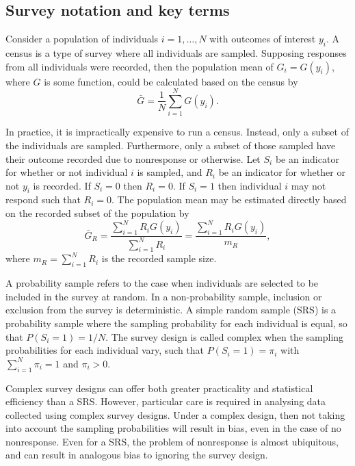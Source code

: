 \documentclass[a4paper, nobind]{templates/ociamthesis}
\begin{document}
\hypertarget{survey-notation-and-key-terms}{%
\subsection{Survey notation and key terms}\label{survey-notation-and-key-terms}}

Consider a population of individuals \(i = 1, \ldots, N\) with outcomes of interest \(y_i\).
A census is a type of survey where all individuals are sampled.
Supposing responses from all individuals were recorded, then the population mean of \(G_i = G(y_i)\), where \(G\) is some function, could be calculated based on the census by
\begin{equation}
\bar G = \frac{1}{N} \sum_{i = 1}^N G(y_i).
\end{equation}

In practice, it is impractically expensive to run a census.
Instead, only a subset of the individuals are sampled.
Furthermore, only a subset of those sampled have their outcome recorded due to nonresponse or otherwise.
Let \(S_i\) be an indicator for whether or not individual \(i\) is sampled, and \(R_i\) be an indicator for whether or not \(y_i\) is recorded.
If \(S_i = 0\) then \(R_i = 0\).
If \(S_i = 1\) then individual \(i\) may not respond such that \(R_i = 0\).
The population mean may be estimated directly based on the recorded subset of the population by
\begin{equation}
\bar G_R = \frac{\sum_{i = 1}^N R_i G(y_i)}{\sum_{i = 1}^N R_i} = \frac{\sum_{i = 1}^N R_i G(y_i)}{m_R}, \label{eq:direct}
\end{equation}
where \(m_R = \sum_{i = 1}^N R_i\) is the recorded sample size.

A probability sample refers to the case when individuals are selected to be included in the survey at random.
In a non-probability sample, inclusion or exclusion from the survey is deterministic.
A simple random sample (SRS) is a probability sample where the sampling probability for each individual is equal, so that \(P(S_i = 1) = 1 / N\).
The survey design is called complex when the sampling probabilities for each individual vary, such that \(P(S_i = 1) = \pi_i\) with \(\sum_{i = 1}^N \pi_i = 1\) and \(\pi_i > 0\).

Complex survey designs can offer both greater practicality and statistical efficiency than a SRS.
However, particular care is required in analysing data collected using complex survey designs.
Under a complex design, then not taking into account the sampling probabilities will result in bias, even in the case of no nonresponse.
Even for a SRS, the problem of nonresponse is almost ubiquitous, and can result in analogous bias to ignoring the survey design.
\end{document}
